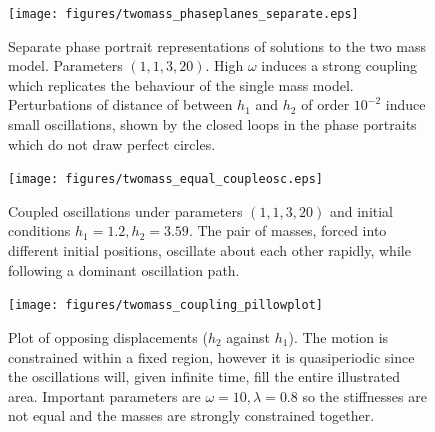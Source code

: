 \begin{figure}[h!]
    \centering
    \texttt{[image: figures/twomass\_phaseplanes\_separate.eps]}
    \caption{
        Separate phase portrait representations of solutions to the two mass model.
        Parameters \((1,1,3,20)\). High $\omega$ induces a strong coupling which replicates the behaviour of the single mass model.
        Perturbations of distance of between $h_1$ and $h_2$ of order $10^{-2}$ induce small oscillations,
        shown by the closed loops in the phase portraits which do not draw perfect circles.
    }
    \label{fig:twomass_phaseportrait_replicated}
\end{figure}

\begin{figure}[h!]
    \centering
    \texttt{[image: figures/twomass\_equal\_coupleosc.eps]}
    \caption{Coupled oscillations under parameters \((1, 1, 3, 20)\) and initial conditions \(h_1 = 1.2, h_2 = 3.59\).
    The pair of masses, forced into different initial positions,
    oscillate about each other rapidly, while following a dominant oscillation path.}
    \label{fig:twomass_dominant_osc}
\end{figure}

\begin{figure}[h!]
    \centering
    \texttt{[image: figures/twomass\_coupling\_pillowplot]}
    \caption{
        Plot of opposing displacements ($h_2$ against $h_1$). The motion is constrained within a fixed region,
        however it is quasiperiodic since the oscillations will, given infinite time, fill the entire illustrated area.
        Important parameters are \(\omega = 10, \lambda = 0.8\) so the stiffnesses are not equal and the masses are strongly constrained together.
    }
    \label{fig:twomass_quasiperiodic}
\end{figure} %

